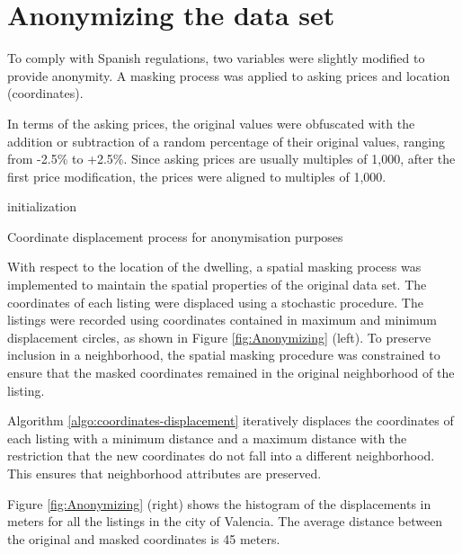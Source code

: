 \documentclass[Royal,times,sageh]{sagej}
\begin{document}
\hypertarget{anonymizing}{%
\section{Anonymizing the data set}\label{anonymizing}}

To comply with Spanish regulations, two variables were slightly modified
to provide anonymity. A masking process was applied to asking prices and
location (coordinates).

In terms of the asking prices, the original values were obfuscated with
the addition or subtraction of a random percentage of their original
values, ranging from -2.5\% to +2.5\%. Since asking prices are usually
multiples of 1,000, after the first price modification, the prices were
aligned to multiples of 1,000.

\begin{algorithm}[!ht]
 initialization\;
 \caption{Coordinate displacement process for anonymisation purposes}
 \label{algo:coordinates-displacement}
\end{algorithm}

With respect to the location of the dwelling, a spatial masking process
was implemented to maintain the spatial properties of the original data
set. The coordinates of each listing were displaced using a stochastic
procedure. The listings were recorded using coordinates contained in
maximum and minimum displacement circles, as shown in Figure
\ref{fig:Anonymizing} (left). To preserve inclusion in a neighborhood,
the spatial masking procedure was constrained to ensure that the masked
coordinates remained in the original neighborhood of the listing.

Algorithm \ref{algo:coordinates-displacement} iteratively displaces the
coordinates of each listing with a minimum distance and a maximum
distance with the restriction that the new coordinates do not fall into
a different neighborhood. This ensures that neighborhood attributes are
preserved.

Figure \ref{fig:Anonymizing} (right) shows the histogram of the
displacements in meters for all the listings in the city of Valencia.
The average distance between the original and masked coordinates is 45
meters.
\end{document}

